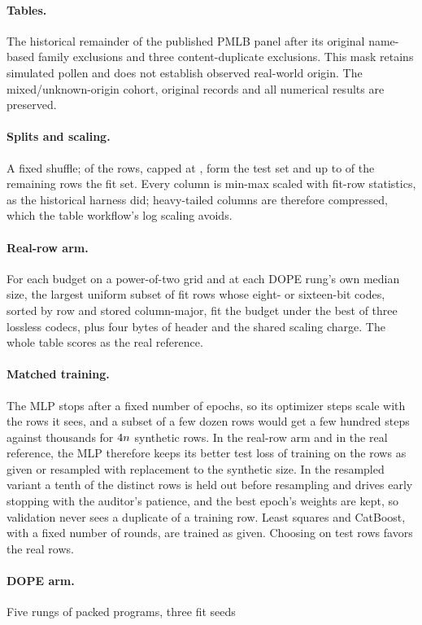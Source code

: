 \documentclass{article}
\begin{document}
\paragraph{Tables.} The historical remainder of the published PMLB panel after its original
name-based family exclusions and three content-duplicate exclusions. This mask
retains simulated pollen and does not establish observed real-world origin.
The mixed/unknown-origin cohort, original records and all numerical results are preserved. \paragraph{Splits and scaling.} A fixed shuffle; \cTestShare{} of the rows, capped at
\cFitCap{}, form the test set and up to \cFitCap{} of the remaining rows the fit set. Every column is
min-max scaled with fit-row statistics, as the historical harness did; heavy-tailed columns are therefore
compressed, which the table workflow's log scaling avoids. \paragraph{Real-row arm.} For each budget on a
power-of-two grid and at each DOPE rung's own median size, the largest uniform subset of fit rows whose
eight- or sixteen-bit codes, sorted by row and stored column-major, fit the budget under the best of three
lossless codecs, plus four bytes of header and the shared scaling charge. The whole table scores as the
real reference. \paragraph{Matched training.} The MLP stops after a fixed number of epochs, so its
optimizer steps scale with the rows it sees, and a subset of a few dozen rows would get a few hundred steps
against thousands for $4n$ synthetic rows. In the real-row arm and in the real reference, the MLP
therefore keeps its better test loss of training on the rows as given or resampled with replacement to the
synthetic size. In the resampled variant a tenth of the distinct rows is held out before resampling and
drives early stopping with the auditor's patience, and the best epoch's weights are kept, so validation
never sees a duplicate of a training row. Least squares and CatBoost, with a fixed number of rounds, are
trained as given. Choosing on test rows favors the real rows. \paragraph{DOPE arm.} Five rungs of packed programs, three fit seeds
\end{document}
